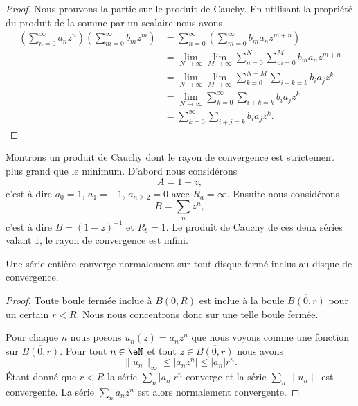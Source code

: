 \begin{proof}
    Nous prouvons la partie sur le produit de Cauchy. En utilisant la propriété du produit de la somme par un scalaire nous avons
    \begin{subequations}
        \begin{align}
            \left( \sum_{n=0}^{\infty}a_nz^n \right)\left( \sum_{m=0}^{\infty}b_mz^m \right)&=\sum_{n=0}^{\infty}\left( \sum_{m=0}^{\infty}b_ma_nz^{m+n} \right)\\
            &=\lim_{N\to \infty} \lim_{M\to \infty} \sum_{n=0}^N\sum_{m=0}^Mb_ma_nz^{m+n}\\
            &=\lim_{N\to \infty} \lim_{M\to \infty} \sum_{k=0}^{N+M}\sum_{i+k=k}b_ia_jz^k\\
            &=\lim_{N\to \infty} \sum_{k=0}^{\infty}\sum_{i+k=k}b_ia_jz^k\\
            &=\sum_{k=0}^{\infty}\sum_{i+j=k}b_ia_jz^k.
        \end{align}
    \end{subequations}
\end{proof}

\begin{example}
    Montrons un produit de Cauchy dont le rayon de convergence est strictement plus grand que le minimum. D'abord nous considérons
    \begin{equation}
        A=1-z,
    \end{equation}
    c'est à dire \( a_0=1\), \( a_1=-1\), \( a_{n\geq 2}=0\) avec \( R_a=\infty\). Ensuite nous considérons
    \begin{equation}
        B=\sum_nz^n,
    \end{equation}
    c'est à dire \( B=(1-z)^{-1}\) et \( R_b=1\). Le produit de Cauchy de ces deux séries valant \( 1\), le rayon de convergence est infini.
\end{example}


\begin{theorem}
    Une série entière converge normalement sur tout disque fermé inclus au disque de convergence.
\end{theorem}

\begin{proof}
    Toute boule fermée inclue à \( B(0,R)\) est inclue à la boule \( \overline{ B(0,r) }\) pour un certain \( r<R\). Nous nous concentrons donc sur une telle boule fermée.

    Pour chaque \( n\) nous posons \( u_n(z)=a_nz^n\) que nous voyons comme une fonction sur \( \overline{ B(0,r) }\). Pour tout \( n\in \eN\) et tout \( z\in\overline{ B(0,r) }\) nous avons 
    \begin{equation}
        \| u_n \|_{\infty}\leq| a_nz^n |\leq | a_n |r^n.
    \end{equation}
    Étant donné que \( r<R\) la série \( \sum_n | a_n |r^n\) converge et la série \( \sum_n\| u_n \|\) est convergente. La série \( \sum_na_nz^n\) est alors normalement convergente.
\end{proof}

